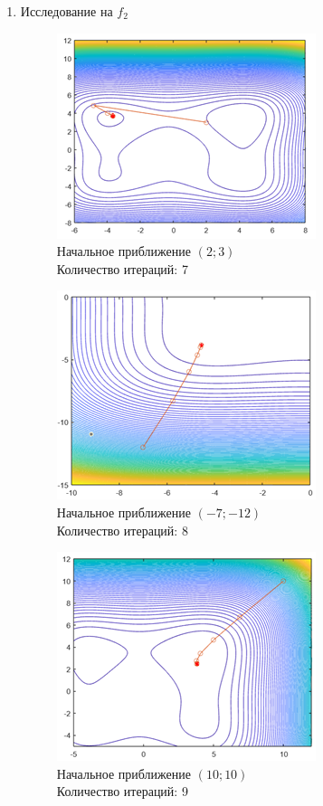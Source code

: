 \documentclass[12pt]{article}
\begin{document}
\begin{enumerate}
	\item Исследование на $f_2$

		\begin{figure}[H]
    	\centering
    	\includegraphics[]{img/f2_1_1.png}
    	\\ Начальное приближение $\left( 2; 3 \right)$
    	\\ Количество итераций: 7
    \end{figure}

	\begin{figure}[H]
    	\centering
    	\includegraphics[]{img/f2_1_2.png}
    	\\ Начальное приближение $\left( -7; -12 \right)$
    	\\ Количество итераций: 8
    \end{figure}

	\begin{figure}[H]
    	\centering
    	\includegraphics[]{img/f2_1_3.png}
    	\\ Начальное приближение $\left( 10; 10 \right)$
    	\\ Количество итераций: 9
    \end{figure}


\end{enumerate}
\end{document}
